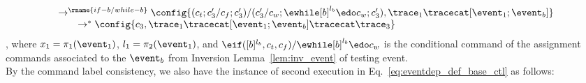 \begin{subproof}
\begin{equation}
\begin{array}{l}
   \rightarrow^{\rname{if-b / while-b}} 
  \config{(c_t;c_3' / c_f;c_3') /(c_3' / c_w; \ewhile [b]^{l_b} \edo c_w;{c}_3'), 
  \trace_1 \tracecat [\event_1;\event_b]} 
  \\
  \qquad   \rightarrow^{*} 
  \config{c_3, 
  \trace_1 \tracecat [\event_1;\event_b] \tracecat  \trace_3}
\end{array}
\end{equation}
, where $x_1 = \pi_1(\event_1)$, $l_1 = {\pi_2(\event_1)}$, 
and $\eif ([b]^{l_b}, c_t, c_f) / \ewhile [b]^{l_b} \edo c_w$ 
is the conditional command of the assignment commands 
associated to the $\event_b$ from Inversion Lemma~\ref{lem:inv_event} of testing event.
\\
%
By the command label consistency,
we also have the instance of second execution in Eq.~\ref{eq:eventdep_def_base_ctl} as follows:

\end{subproof}
